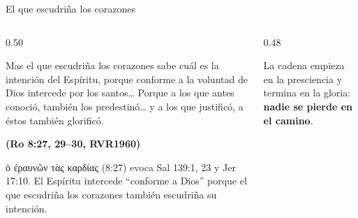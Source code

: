 \documentclass[hyperref={bookmarks=false},aspectratio=169]{beamer}
\newcommand{\grc}[1]{\foreignlanguage{ancientgreek}{#1}}
\newcommand{\fuente}[1]{\par\hfill{\upshape\bfseries\footnotesize\textcolor{azul}{#1}}}
\newcommand{\destacar}[1]{\textbf{\textcolor{azul}{#1}}}
\begin{document}
\begin{frame}{El que escudriña los corazones}
\begin{columns}[c,onlytextwidth]
\begin{column}{0.50\textwidth}
\begin{cita}Mas el que escudriña los corazones sabe cuál es la intención del Espíritu, porque conforme a la voluntad de Dios intercede por los santos\ldots{} Porque a los que antes conoció, también los predestinó\ldots{} y a los que justificó, a éstos también glorificó.\fuente{(Ro 8:27, 29--30, RVR1960)}\end{cita}
\scriptsize\grc{ὁ ἐραυνῶν τὰς καρδίας} (8:27) evoca Sal 139:1, 23 y Jer 17:10. El Espíritu intercede ``conforme a Dios'' porque el que escudriña los corazones también escudriña su intención.
\end{column}
\begin{column}{0.48\textwidth}
\centering
{}\par\smallskip
\scriptsize La cadena empieza en la presciencia y termina en la gloria: \destacar{nadie se pierde en el camino}.
\end{column}
\end{columns}
\end{frame}
\end{document}
